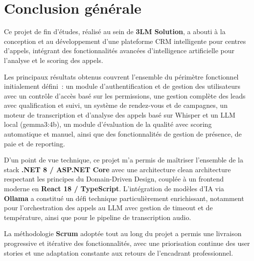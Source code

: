 \chapter*{Conclusion générale}

\thispagestyle{fancy}


Ce projet de fin d'études, réalisé au sein de \textbf{3LM Solution}, a abouti à
la conception et au développement d'une plateforme CRM intelligente pour
centres d'appels, intégrant des fonctionnalités avancées d'intelligence
artificielle pour l'analyse et le scoring des appels.

Les principaux résultats obtenus couvrent l'ensemble du périmètre fonctionnel
initialement défini~: un module d'authentification et de gestion des
utilisateurs avec un contrôle d'accès basé sur les permissions, une gestion
complète des leads avec qualification et suivi, un système de rendez-vous et
de campagnes, un moteur de transcription et d'analyse des appels basé sur
Whisper et un LLM local (gemma3:4b), un module d'évaluation de la qualité
avec scoring automatique et manuel, ainsi que des fonctionnalités de gestion
de présence, de paie et de reporting.

D'un point de vue technique, ce projet m'a permis de maîtriser l'ensemble de
la stack \textbf{.NET 8 / ASP.NET Core} avec une architecture clean
architecture respectant les principes du Domain-Driven Design, couplée à un
frontend moderne en \textbf{React 18 / TypeScript}. L'intégration de modèles
d'IA via \textbf{Ollama} a constitué un défi technique particulièrement
enrichissant, notamment pour l'orchestration des appels au LLM avec gestion
de timeout et de température, ainsi que pour le pipeline de transcription
audio.

La méthodologie \textbf{Scrum} adoptée tout au long du projet a permis une
livraison progressive et itérative des fonctionnalités, avec une priorisation
continue des user stories et une adaptation constante aux retours de
l'encadrant professionnel.

